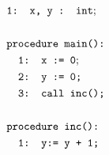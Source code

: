 \documentclass{article}
\begin{document}
	\begin{minipage}{.3\textwidth}
		\centering
		\begin{align*}
		&\texttt{1: x, y : int}; \\ \\
		&\texttt{procedure main():} \\
		&\texttt{\hspace*{1em}1:  x := 0}; \\
		&\texttt{\hspace*{1em}2:  y := 0;} \\
		&\texttt{\hspace*{1em}3: call inc();} \\ \\
		&\texttt{procedure inc():} \\
		&\texttt{\hspace*{1em}1: y:= y\ +\ 1;} \\
		\end{align*}
		
		\label{fig:square}
	\end{minipage}%
	\hfill
\end{document}
